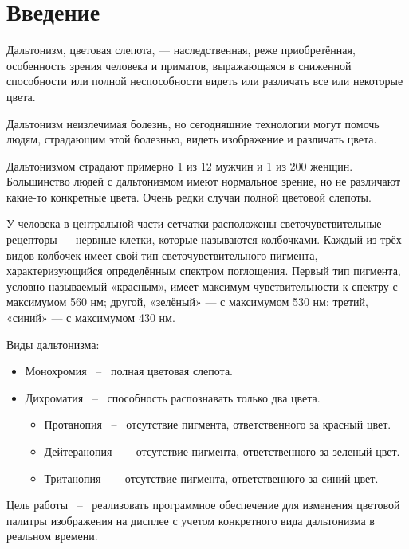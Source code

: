\documentclass[a4paper,14pt, unknownkeysallowed]{extreport}
\begin{document}
    \tableofcontents

    \chapter*{Введение}

    Дальтонизм, цветовая слепота, — наследственная, реже приобретённая, особенность зрения человека и приматов, выражающаяся в сниженной способности или полной неспособности видеть или различать все или некоторые цвета.

    Дальтонизм неизлечимая болезнь, но сегодняшние технологии могут помочь людям, страдающим этой болезнью, видеть изображение и различать цвета.

    Дальтонизмом страдают примерно 1 из 12 мужчин и 1 из 200 женщин. Большинство людей с дальтонизмом имеют нормальное зрение, но не различают какие-то конкретные цвета. Очень редки случаи полной цветовой слепоты.

    У человека в центральной части сетчатки расположены светочувствительные рецепторы — нервные клетки, которые называются колбочками. Каждый из трёх видов колбочек имеет свой тип светочувствительного пигмента, характеризующийся определённым спектром поглощения. Первый тип пигмента, условно называемый «красным», имеет максимум чувствительности к спектру с максимумом 560 нм; другой, «зелёный» — с максимумом 530 нм; третий, «синий» — с максимумом 430 нм.

    Виды дальтонизма:

    \begin{itemize}
        \item Монохромия ~--~ полная цветовая слепота.
        \item Дихроматия ~--~ способность распознавать только два цвета.
        \begin{itemize}
            \item Протанопия ~--~ отсутствие пигмента, ответственного за красный цвет.
            \item Дейтеранопия ~--~ отсутствие пигмента, ответственного за зеленый цвет.
            \item Тританопия ~--~ отсутствие пигмента, ответственного за синий цвет.
        \end{itemize}
    \end{itemize}

    Цель работы ~--~ реализовать программное обеспечение для изменения цветовой палитры изображения на дисплее с учетом конкретного вида дальтонизма в реальном времени.
\end{document}
